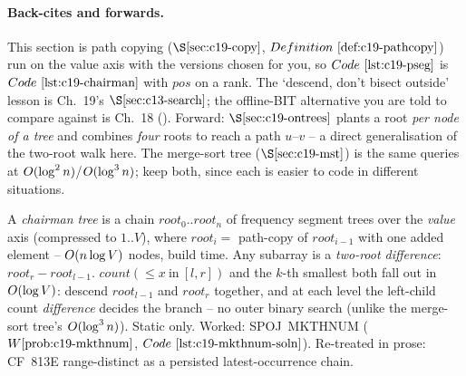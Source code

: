 \paragraph{Back-cites and forwards.}
This section is path copying (\(\secref{c19-copy}\), \(\defref{c19-pathcopy}\)) run on the value axis with the versions chosen for you, so \(\coderef{c19-pseg}\) is \(\coderef{c19-chairman}\) with \(\mathit{pos}\) on a rank. The `descend, don't bisect outside' lesson is Ch.~19's \(\secref{c13-search}\); the offline-BIT alternative you are told to compare against is Ch.~18 (). Forward: \(\secref{c19-ontrees}\) plants a root \emph{per node of a tree} and combines \emph{four} roots to reach a path \(u\text{--}v\) -- a direct generalisation of the two-root walk here. The merge-sort tree (\(\secref{c19-mst}\)) is the same queries at \(O(\log^2 n)\)/\(O(\log^3 n)\); keep both, since each is easier to code in different situations.

\begin{recallbox}
A \emph{chairman tree} is a chain \(\mathit{root}_0..\mathit{root}_n\) of frequency segment trees over the \emph{value} axis (compressed to \(1..V\)), where \(\mathit{root}_i=\) path-copy of \(\mathit{root}_{i-1}\) with one added element -- \(O(n\log V)\) nodes, build time. Any subarray is a \emph{two-root difference}: \(\mathit{root}_r-\mathit{root}_{l-1}\). \(\mathit{count}(\le x\ \text{in}\ [l,r])\) and the \(k\)-th smallest both fall out in \(O(\log V)\): descend \(\mathit{root}_{l-1}\) and \(\mathit{root}_r\) together, and at each level the left-child count \emph{difference} decides the branch -- no outer binary search (unlike the merge-sort tree's \(O(\log^3 n)\)). Static only. Worked: SPOJ~MKTHNUM (\(\probref{c19-mkthnum}\), \(\coderef{c19-mkthnum-soln}\)). Re-treated in prose: CF~813E range-distinct as a persisted latest-occurrence chain.
\end{recallbox}
